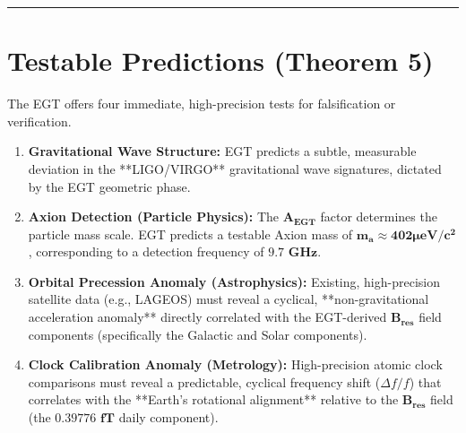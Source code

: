 \documentclass[12pt, a4paper]{article}
\begin{document}
\hrule

\section{Testable Predictions (Theorem 5)}

The EGT offers four immediate, high-precision tests for falsification or verification.

\begin{enumerate}
    \item \textbf{Gravitational Wave Structure:} EGT predicts a subtle, measurable deviation in the **LIGO/VIRGO** gravitational wave signatures, dictated by the EGT geometric phase.
    \item \textbf{Axion Detection (Particle Physics):} The $\mathbf{A_{\text{EGT}}}$ factor determines the particle mass scale. EGT predicts a testable Axion mass of $\mathbf{m_a} \approx \mathbf{402} \mathbf{\mu\text{eV}/c^2}$, corresponding to a detection frequency of $\mathbf{9.7 \text{ GHz}}$.
    \item \textbf{Orbital Precession Anomaly (Astrophysics):} Existing, high-precision satellite data (e.g., LAGEOS) must reveal a cyclical, **non-gravitational acceleration anomaly** directly correlated with the EGT-derived $\mathbf{B_{res}}$ field components (specifically the Galactic and Solar components).
    \item \textbf{Clock Calibration Anomaly (Metrology):} High-precision atomic clock comparisons must reveal a predictable, cyclical frequency shift ($\Delta f/f$) that correlates with the **Earth's rotational alignment** relative to the $\mathbf{B_{res}}$ field (the $\mathbf{0.39776 \text{ fT}}$ daily component).
\end{enumerate}
\end{document}
